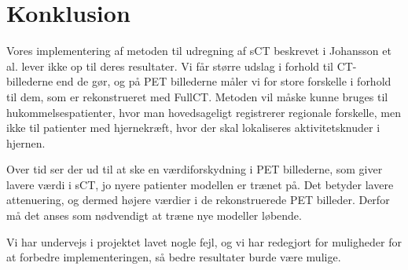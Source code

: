 \section{Konklusion}

Vores implementering af metoden til udregning af sCT beskrevet i Johansson
et al. lever ikke op til deres resultater. Vi får større udslag i forhold
til CT-billederne end de gør, og på PET billederne måler vi for store
forskelle i forhold til dem, som er rekonstrueret med FullCT.  Metoden vil
måske kunne bruges til hukommelsespatienter, hvor man hovedsageligt
registrerer regionale forskelle, men ikke til patienter med hjernekræft,
hvor der skal lokaliseres aktivitetsknuder i hjernen.

Over tid ser der ud til at ske en værdiforskydning i PET billederne, som
giver lavere værdi i sCT, jo nyere patienter modellen er trænet på. Det
betyder lavere attenuering, og dermed højere værdier i de rekonstruerede
PET billeder. Derfor må det anses som nødvendigt at træne nye modeller
løbende.

Vi har undervejs i projektet lavet nogle fejl, og vi har redegjort for
muligheder for at forbedre implementeringen, så bedre resultater burde
være mulige.


